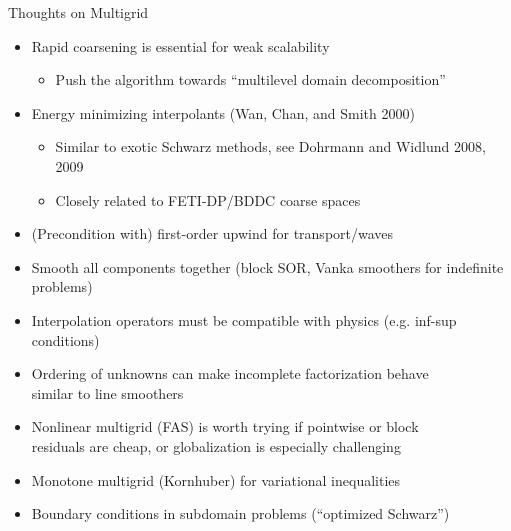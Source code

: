 \begin{frame}{Thoughts on Multigrid}
  \begin{itemize}
  \item Rapid coarsening is essential for weak scalability
    \begin{itemize}
    \item Push the algorithm towards ``multilevel domain decomposition''
    \end{itemize}
  \item Energy minimizing interpolants (Wan, Chan, and Smith 2000)
    \begin{itemize}
    \item Similar to exotic Schwarz methods, see Dohrmann and Widlund 2008, 2009
    \item Closely related to FETI-DP/BDDC coarse spaces
    \end{itemize}
  \item (Precondition with) first-order upwind for transport/waves
  \item Smooth all components together (block SOR, Vanka smoothers for indefinite problems)
  \item Interpolation operators must be compatible with physics (e.g. inf-sup conditions)
  \item Ordering of unknowns can make incomplete factorization behave \\
    similar to line smoothers
  \item Nonlinear multigrid (FAS) is worth trying if pointwise or block \\
    residuals are cheap, or globalization is especially challenging
  \item Monotone multigrid (Kornhuber) for variational inequalities
  \item Boundary conditions in subdomain problems (``optimized Schwarz'')
  \end{itemize}
\end{frame}
